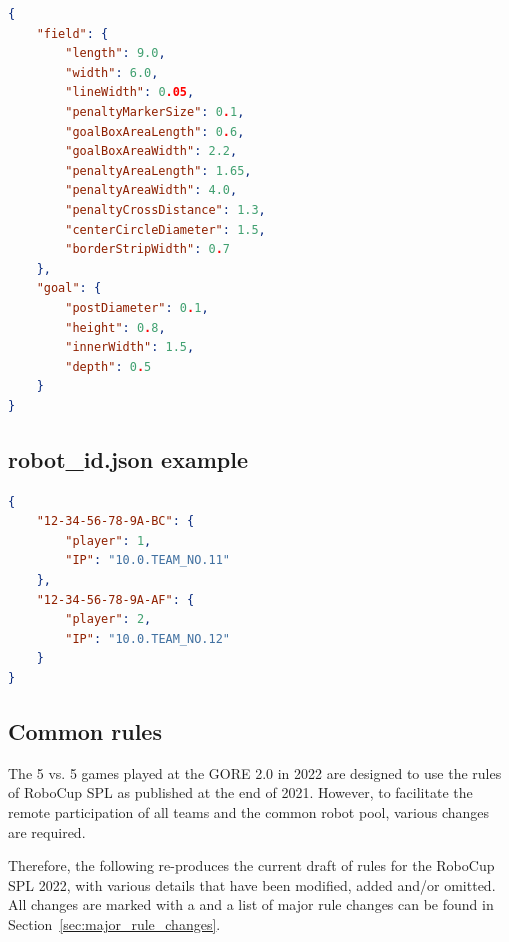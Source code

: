 \begin{lstlisting}[language=json,firstnumber=1]
{
    "field": {
        "length": 9.0,
        "width": 6.0,
        "lineWidth": 0.05,
        "penaltyMarkerSize": 0.1,
        "goalBoxAreaLength": 0.6,
        "goalBoxAreaWidth": 2.2,
        "penaltyAreaLength": 1.65,
        "penaltyAreaWidth": 4.0,
        "penaltyCrossDistance": 1.3,
        "centerCircleDiameter": 1.5,
        "borderStripWidth": 0.7
    },
    "goal": {
        "postDiameter": 0.1,
        "height": 0.8,
        "innerWidth": 1.5,
        "depth": 0.5
    }
}
\end{lstlisting}


\subsection{robot\_id.json example}
\label{sec:robotidjson}

\begin{lstlisting}[language=json,firstnumber=1]
{
    "12-34-56-78-9A-BC": {
        "player": 1,
        "IP": "10.0.TEAM_NO.11"
    },
    "12-34-56-78-9A-AF": {
        "player": 2,
        "IP": "10.0.TEAM_NO.12"
    }
}
\end{lstlisting}

\subsection{Common rules}
\label{sec:Common_rules}
The 5 vs. 5 games played at the GORE 2.0 in 2022 are designed to use the rules of RoboCup SPL as published at the end of 2021. However, to facilitate the remote participation of all teams and the common robot pool, various changes are required.

Therefore, the following re-produces the current draft of rules for the RoboCup SPL 2022, with various details that have been modified, added and/or omitted. All changes are marked with a  and a list of major rule changes can be found in Section~\ref{sec:major_rule_changes}.


